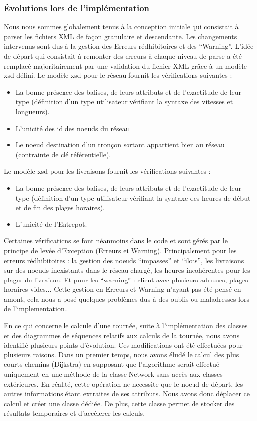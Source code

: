\subsubsection{Évolutions lors de l'implémentation}
Nous nous sommes globalement tenus à la conception initiale qui consistait à parser les fichiers XML de façon granulaire et descendante. Les changements intervenus sont dus à la gestion des Erreurs rédhibitoires et des “Warning”. 
L’idée de départ qui consistait à remonter des erreurs à chaque niveau de parse a été remplacé majoritairement par une validation du fichier XML grâce à un modèle xsd défini.
Le modèle xsd pour le réseau fournit les vérifications suivantes :
\begin{itemize} 
\item La bonne présence des balises, de leurs attributs et de l’exactitude de leur type (définition d’un type utilisateur vérifiant la syntaxe des vitesses et longueurs).
\item L’unicité des id des noeuds du réseau
\item Le noeud destination d’un tronçon sortant appartient bien au réseau (contrainte de clé référentielle).
\end{itemize}
Le modèle xsd pour les livraisons fournit les vérifications suivantes : 
\begin{itemize}
\item La bonne présence des balises, de leurs attributs et de l’exactitude de leur type (définition d’un type utilisateur vérifiant la syntaxe des heures de début et de fin des plages horaires).
\item L’unicité de l’Entrepot.
\end{itemize}
Certaines vérifications se font néanmoins dans le code et sont gérés par le principe de levée d’Exception (Erreurs et Warning). Principalement pour les erreurs rédhibitoires : la gestion des noeuds “impasses” et “ilots”, les livraisons sur des noeuds inexistants dans le réseau chargé, les heures incohérentes pour les plages de livraison. Et pour les “warning” : client avec plusieurs adresses, plages horaires vides...
Cette gestion en Erreurs et Warning n’ayant pas été pensé en amont, cela nous a posé quelques problèmes dus à des oublis ou maladresses lors de l'implementation..

En ce qui concerne le calcule d'une tournée, suite à l’implémentation des classes et des diagrammes de séquences relatifs aux calculs de la tournée, nous avons identifié plusieurs points d’évolution. Ces modifications ont été effectuées pour plusieurs raisons.
Dans un premier temps, nous avons éludé le calcul des plus courts chemins (Dijkstra) en supposant que l’algorithme serait effectué uniquement en une méthode de la classe Network sans accès aux classes extérieures. En réalité, cette opération ne necessite que le noeud de départ, les autres informations étant extraites de ses attributs. Nous avons donc déplacer ce calcul et créer une classe dédiée. De plus, cette classe permet de stocker des résultats temporaires et d’accélerer les calculs.

